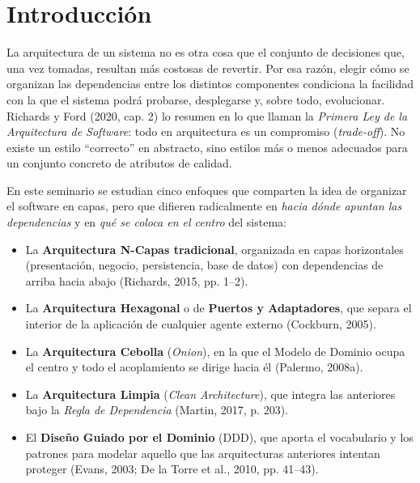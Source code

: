 \documentclass[11pt,a4paper]{article}
\begin{document}
\tableofcontents
\newpage

\section{Introducción}

La arquitectura de un sistema no es otra cosa que el conjunto de decisiones que, una vez tomadas, resultan más costosas de revertir. Por esa razón, elegir cómo se organizan las dependencias entre los distintos componentes condiciona la facilidad con la que el sistema podrá probarse, desplegarse y, sobre todo, evolucionar. Richards y Ford (2020, cap. 2) lo resumen en lo que llaman la \emph{Primera Ley de la Arquitectura de Software}: todo en arquitectura es un compromiso (\emph{trade-off}). No existe un estilo ``correcto'' en abstracto, sino estilos más o menos adecuados para un conjunto concreto de atributos de calidad.

En este seminario se estudian cinco enfoques que comparten la idea de organizar el software en capas, pero que difieren radicalmente en \emph{hacia dónde apuntan las dependencias} y en \emph{qué se coloca en el centro} del sistema:

\begin{itemize}[leftmargin=1.5em]
  \item La \textbf{Arquitectura N-Capas tradicional}, organizada en capas horizontales (presentación, negocio, persistencia, base de datos) con dependencias de arriba hacia abajo (Richards, 2015, pp. 1--2).
  \item La \textbf{Arquitectura Hexagonal} o de \textbf{Puertos y Adaptadores}, que separa el interior de la aplicación de cualquier agente externo (Cockburn, 2005).
  \item La \textbf{Arquitectura Cebolla} (\emph{Onion}), en la que el Modelo de Dominio ocupa el centro y todo el acoplamiento se dirige hacia él (Palermo, 2008a).
  \item La \textbf{Arquitectura Limpia} (\emph{Clean Architecture}), que integra las anteriores bajo la \emph{Regla de Dependencia} (Martin, 2017, p. 203).
  \item El \textbf{Diseño Guiado por el Dominio} (DDD), que aporta el vocabulario y los patrones para modelar aquello que las arquitecturas anteriores intentan proteger (Evans, 2003; De la Torre et al., 2010, pp. 41--43).
\end{itemize}
\end{document}
